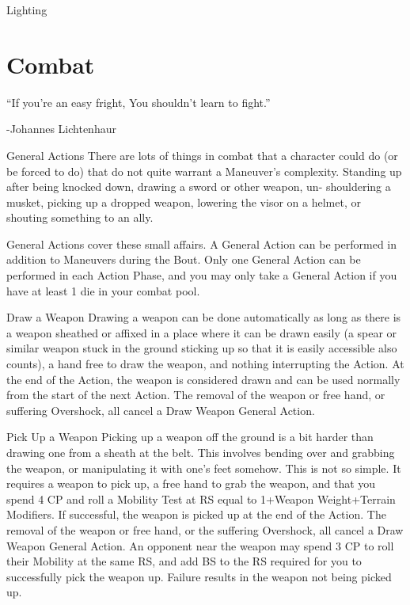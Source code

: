 \documentclass[oneside,11pt,english]{book}
\begin{document}
Lighting 

 

\chapter{Combat}\label{ch:combat}
\clearpage

“If you’re an easy fright, 
You shouldn’t learn to fight.” 

-Johannes Lichtenhaur 

 


 

General Actions 
There are lots of things in combat that a character could do (or be forced to do) that do not quite warrant a 
Maneuver’s complexity. Standing up after being knocked down, drawing a sword or other weapon, un-
shouldering a musket, picking up a dropped weapon, lowering the visor on a helmet, or shouting 
something to an ally. 

 

General Actions cover these small affairs. A General Action can be performed in addition to Maneuvers 
during the Bout. Only one General Action can be performed in each Action Phase, and you may only take 
a General Action if you have at least 1 die in your combat pool. 

 

Draw a Weapon 
Drawing a weapon can be done automatically as long as there is a weapon sheathed or affixed in a place 
where it can be drawn easily (a spear or similar weapon stuck in the ground sticking up so that it is easily 
accessible also counts), a hand free to draw the weapon, and nothing interrupting the Action. At the end 
of the Action, the weapon is considered drawn and can be used normally from the start of the next Action. 
The removal of the weapon or free hand, or suffering Overshock, all cancel a Draw Weapon General 
Action. 

 

Pick Up a Weapon 
Picking up a weapon off the ground is a bit harder than drawing one from a sheath at the belt. This 
involves bending over and grabbing the weapon, or manipulating it with one’s feet somehow. This is not 
so simple. It requires a weapon to pick up, a free hand to grab the weapon, and that you spend 4 CP and 
roll a Mobility Test at RS equal to 1+Weapon Weight+Terrain Modifiers. If successful, the weapon is 
picked up at the end of the Action. The removal of the weapon or free hand, or the suffering Overshock, 
all cancel a Draw Weapon General Action. An opponent near the weapon may spend 3 CP to roll their 
Mobility at the same RS, and add BS to the RS required for you to successfully pick the weapon up. 
Failure results in the weapon not being picked up. 
\end{document}
